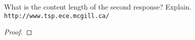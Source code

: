 \documentclass[../../main.tex]{subfiles}
\begin{document}
\begin{wts}
What is the content length of the second response? Explain. \lstinline{http://www.tsp.ece.mcgill.ca/}
\end{wts}
\begin{proof}

\end{proof}
\end{document}

